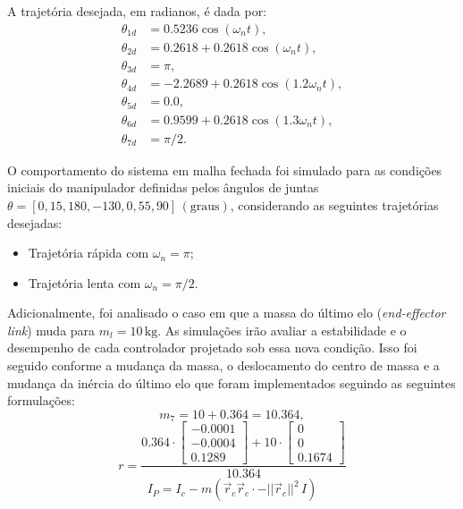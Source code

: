 \documentclass[10pt]{article}
\begin{document}
A trajetória desejada, em radianos, é dada por:
\begin{align}
    \theta_{1d} &= 0.5236 \cos(\omega_n t), \\
    \theta_{2d} &= 0.2618 + 0.2618 \cos(\omega_n t), \\
    \theta_{3d} &= \pi, \\
    \theta_{4d} &= -2.2689 + 0.2618 \cos(1.2 \omega_n t), \\
    \theta_{5d} &= 0.0, \\
    \theta_{6d} &= 0.9599 + 0.2618 \cos(1.3 \omega_n t), \\
    \theta_{7d} &= \pi/2.
\end{align}

O comportamento do sistema em malha fechada foi simulado para as condições iniciais do manipulador definidas pelos ângulos de juntas \(\theta = [0, 15, 180, -130, 0, 55, 90] \, (\text{graus})\), considerando as seguintes trajetórias desejadas:
\begin{itemize}
    \item Trajetória rápida com \(\omega_n = \pi\);
    \item Trajetória lenta com \(\omega_n = \pi/2\).
\end{itemize}

Adicionalmente, foi analisado o caso em que a massa do último elo (\textit{end-effector link}) muda para \(m_l = 10 \, \text{kg}\).
As simulações irão avaliar a estabilidade e o desempenho de cada controlador projetado sob essa nova condição.
Isso foi seguido conforme a mudança da massa, o deslocamento do centro de massa e a mudança da inércia do último elo que
foram implementados seguindo as seguintes formulações:
\begin{equation}
    m_7 = 10 + 0.364 = 10.364,
\end{equation}
\begin{equation}
    r = \frac{0.364 \cdot \begin{bmatrix} -0.0001 \\ -0.0004 \\ 0.1289 \end{bmatrix} + 10 \cdot \begin{bmatrix} 0 \\ 0 \\ 0.1674 \end{bmatrix}}{10.364}
\end{equation}
\begin{equation}
    I_P = I_c - m \left( \vec{r}_c \vec{r}_c \cdot - ||\vec{r}_c||^2 \, I \right)
\end{equation}
\end{document}
